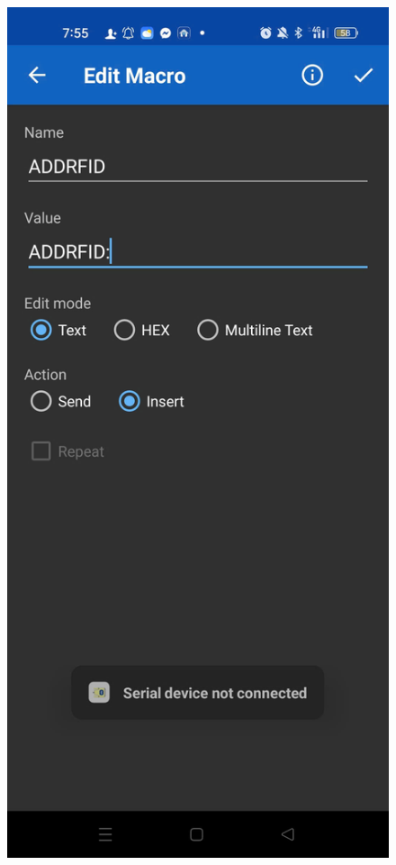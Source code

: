 \documentclass[conference, onecolumn]{IEEEtran}
\begin{document}
\begin{figure}[H]
\begin{minipage}[b]{0.3\textwidth}
	\end{minipage}
	\hspace{0.03\textwidth}
	\begin{minipage}[b]{0.3\textwidth}
		\centering
		\includegraphics[width=\textwidth]{z6844982506330_f85932b8372ab26a42e4c80e493928d8.jpg}

\end{minipage}
\end{figure}
\end{document}

